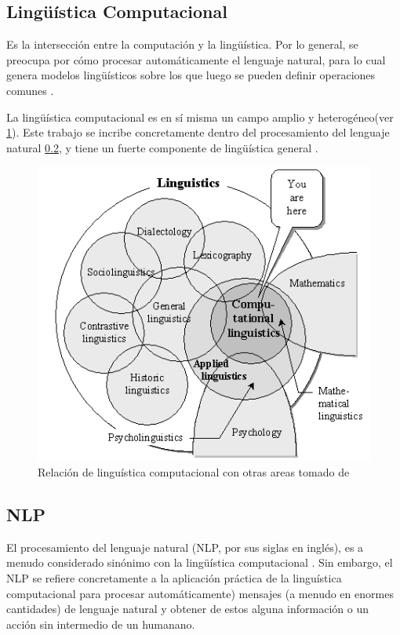 \documentclass[12pt,letterpaper,twoside]{article}
\begin{document}
\subsection{Lingüística Computacional}
\label{sec:org63f6365}

Es la intersección entre la computación y la lingüística. Por lo
general, se preocupa por cómo procesar automáticamente el
lenguaje natural, para lo cual genera modelos lingüísticos sobre los
que luego se pueden definir operaciones comunes \cite{gelbukh2004}.


La lingüística computacional es en sí misma un campo amplio y
heterogéneo(ver \ref{fig:orgf3447fb}).
Este trabajo se incribe concretamente dentro del procesamiento
del lenguaje natural \ref{sec:orgcb37299}, y tiene un fuerte componente de
lingüística general .

\begin{figure}[htbp]
\centering
\includegraphics[width=.9\linewidth]{./assets/mapa_linguistica.png}
\caption{\label{fig:orgf3447fb}Relación de linguística computacional con otras areas tomado de \cite{gelbukh2004}}
\end{figure}


\subsection{NLP}
\label{sec:orgcb37299}
El procesamiento del lenguaje natural (NLP, por sus siglas en
inglés), es a menudo considerado sinónimo con la lingüística
computacional \cite{gelbukh2004}.  Sin embargo, el NLP se refiere
concretamente a la aplicación práctica de la linguística
computacional para procesar automáticamente) mensajes (a menudo en
enormes cantidades) de lenguaje natural y obtener de estos alguna
información o un acción sin intermedio de un humanano.
\end{document}

